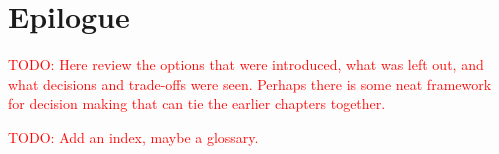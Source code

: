 \documentclass[11pt]{book}
\newcommand{\todo}[1]{\textcolor{red}{TODO: #1}} %
\begin{document}

\chapter*{Epilogue}

\todo{Here review the options that were introduced, what was left out, and what decisions and trade-offs were seen.  Perhaps there is some neat framework for decision making that can tie the earlier chapters together.}

\todo{Add an index, maybe a glossary.}
\end{document}

